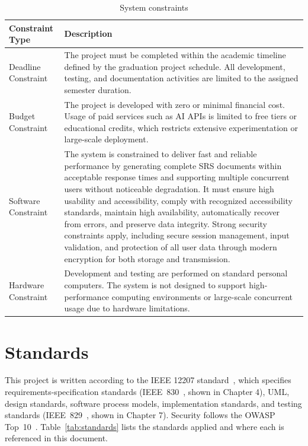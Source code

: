 \documentclass[12pt,a4paper,oneside]{report}
\begin{document}
\begin{longtable}{L{3.5cm} L{9.5cm}}
\caption{System constraints}\label{tab:constraints}\\
\toprule
\textbf{Constraint Type} & \textbf{Description} \\
\midrule
\endhead
Deadline Constraint & The project must be completed within the academic timeline defined by the graduation project schedule. All development, testing, and documentation activities are limited to the assigned semester duration. \\
Budget Constraint & The project is developed with zero or minimal financial cost. Usage of paid services such as AI APIs is limited to free tiers or educational credits, which restricts extensive experimentation or large-scale deployment. \\
Software Constraint & The system is constrained to deliver fast and reliable performance by generating complete SRS documents within acceptable response times and supporting multiple concurrent users without noticeable degradation. It must ensure high usability and accessibility, comply with recognized accessibility standards, maintain high availability, automatically recover from errors, and preserve data integrity. Strong security constraints apply, including secure session management, input validation, and protection of all user data through modern encryption for both storage and transmission. \\
Hardware Constraint & Development and testing are performed on standard personal computers. The system is not designed to support high-performance computing environments or large-scale concurrent usage due to hardware limitations. \\
\bottomrule
\end{longtable}

\section{Standards}
This project is written according to the IEEE 12207 standard~\cite{ref10}, which specifies requirements-specification standards (IEEE~830~\cite{ref8}, shown in Chapter 4), UML, design standards, software process models, implementation standards, and testing standards (IEEE~829~\cite{ref9}, shown in Chapter 7). Security follows the OWASP Top~10~\cite{ref11}. Table~\ref{tab:standards} lists the standards applied and where each is referenced in this document.
\end{document}
